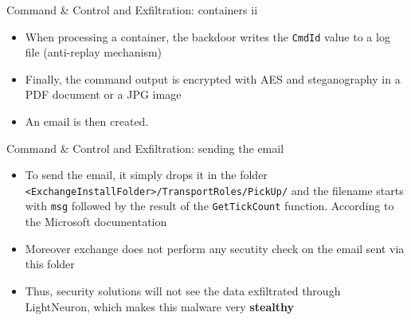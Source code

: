 \begin{frame}[fragile]{Command \& Control and Exfiltration: containers ii}
    \begin{itemize}
        \item When processing a container, the backdoor writes the \texttt{CmdId} value to a log file (anti-replay mechanism)
        \item Finally, the command output is encrypted with AES and steganography in a PDF document or a JPG image
        \item An email is then created.
    \end{itemize}

    \begin{figure}
        \centering
        \qquad
    \end{figure}

\end{frame}

\begin{frame}[fragile]{Command \& Control and Exfiltration: sending the email}
    \begin{itemize}
        \item To send the email, it simply drops it in the folder \\\texttt{<ExchangeInstallFolder>/TransportRoles/PickUp/}
        and the filename starts with \texttt{msg} followed by the result of the \texttt{GetTickCount} function. According to the
        Microsoft documentation \cite{MicroSend}
        \item Moreover exchange does not perform any secutity check on the email sent via this folder
        \item Thus, security solutions will not see the data exfiltrated through LightNeuron, which makes this malware
        very \textbf{stealthy}
    \end{itemize}
\end{frame}

